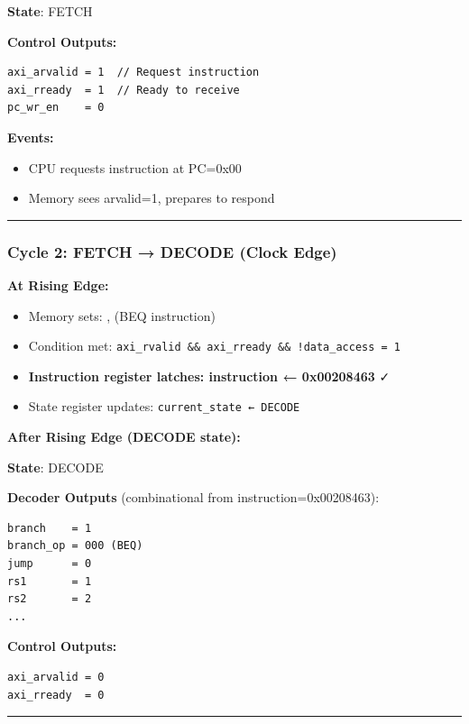 \begin{record}

\textbf{State}: FETCH

\textbf{Control Outputs:}

\begin{lstlisting}[language={}]
axi_arvalid = 1  // Request instruction
axi_rready  = 1  // Ready to receive
pc_wr_en    = 0
\end{lstlisting}

\textbf{Events:}

\begin{itemize}
\tightlist
\item
  CPU requests instruction at PC=0x00
\item
  Memory sees arvalid=1, prepares to respond
\end{itemize}

\begin{center}\rule{0.5\linewidth}{0.5pt}\end{center}

\end{record}

\subsubsection{Cycle 2: FETCH → DECODE (Clock Edge)}\label{cr:fix:timing-analysis:cycle-2-fetch-decode-clock-edge}

\begin{record}

\textbf{At Rising Edge:}

\begin{itemize}
\tightlist
\item
  Memory sets: ,  (BEQ
  instruction)
\item
  Condition met:
  \texttt{axi\_\allowbreak{}rvalid\ \&\&\ axi\_\allowbreak{}rready\ \&\&\ !data\_\allowbreak{}access\ =\allowbreak{}\ 1}
\item
  \textbf{Instruction register latches: instruction ← 0x00208463} ✓
\item
  State register updates:
  \texttt{current\_\allowbreak{}state\ ←\ DECODE}
\end{itemize}

\textbf{After Rising Edge (DECODE state):}

\textbf{State}: DECODE

\textbf{Decoder Outputs} (combinational from instruction=0x00208463):

\begin{lstlisting}[language={}]
branch    = 1
branch_op = 000 (BEQ)
jump      = 0
rs1       = 1
rs2       = 2
...
\end{lstlisting}

\textbf{Control Outputs:}

\begin{lstlisting}[language={}]
axi_arvalid = 0
axi_rready  = 0
\end{lstlisting}

\begin{center}\rule{0.5\linewidth}{0.5pt}\end{center}

\end{record}


